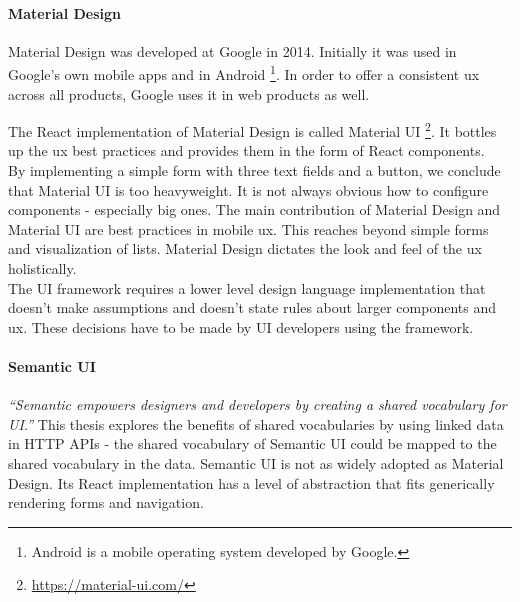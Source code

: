 \paragraph{Material Design}
Material Design was developed at Google in 2014. Initially it was used in Google's own mobile apps and in Android \footnote{Android is a mobile operating system developed by Google.}. In order to offer a consistent \gls{ux} across all products, Google uses it in web products as well.

The React implementation of Material Design is called Material UI \footnote{\url{https://material-ui.com/}}. It bottles up the \gls{ux} best practices and provides them in the form of React components. \\
By implementing a simple form with three text fields and a button, we conclude that Material UI is too heavyweight. It is not always obvious how to configure components - especially big ones. The main contribution of Material Design and Material UI are best practices in mobile \gls{ux}. This reaches beyond simple forms and visualization of lists. Material Design dictates the look and feel of the \gls{ux} holistically. \\
The UI framework requires a lower level design language implementation that doesn't make assumptions and doesn't state rules about larger components and \gls{ux}. These decisions have to be made by UI developers using the framework.

\paragraph{Semantic UI}
\textit{``Semantic empowers designers and developers by creating a shared vocabulary for UI.''} \citep{semanticui} This thesis explores the benefits of shared vocabularies by using linked data in HTTP APIs - the shared vocabulary of Semantic UI could be mapped to the shared vocabulary in the data. Semantic UI is not as widely adopted as Material Design. Its React implementation has a level of abstraction that fits generically rendering forms and navigation.

